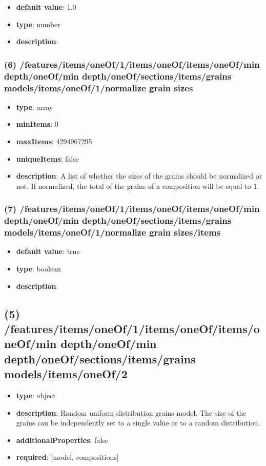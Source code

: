 \begin{itemize}[leftmargin=7em]\item {\bf default value}: 1.0
\item {\bf type}: number
\item {\bf description}: 
\end{itemize}\subsubsection{(6) /features/items/oneOf/1/items/oneOf/items/oneOf/min depth/oneOf/min depth/oneOf/sections/items/grains models/items/oneOf/1/normalize grain sizes}
\begin{itemize}[leftmargin=6em]\item {\bf type}: array
\item {\bf minItems}: 0
\item {\bf maxItems}: 4294967295
\item {\bf uniqueItems}: false
\item {\bf description}: A list of whether the sizes of the grains should be normalized or not. If normalized, the total of the grains of a composition will be equal to 1.
\end{itemize}\subsubsection{(7) /features/items/oneOf/1/items/oneOf/items/oneOf/min depth/oneOf/min depth/oneOf/sections/items/grains models/items/oneOf/1/normalize grain sizes/items}
\begin{itemize}[leftmargin=7em]\item {\bf default value}: true
\item {\bf type}: boolean
\item {\bf description}: 
\end{itemize}\subsection{(5) /features/items/oneOf/1/items/oneOf/items/oneOf/min depth/oneOf/min depth/oneOf/sections/items/grains models/items/oneOf/2}
\begin{itemize}[leftmargin=5em]\item {\bf type}: object
\item {\bf description}: Random uniform distribution grains model. The size of the grains can be independently set to a single value or to a random distribution.
\item {\bf additionalProperties}: false
\item {\bf required}: [model, compositions]\end{itemize}
